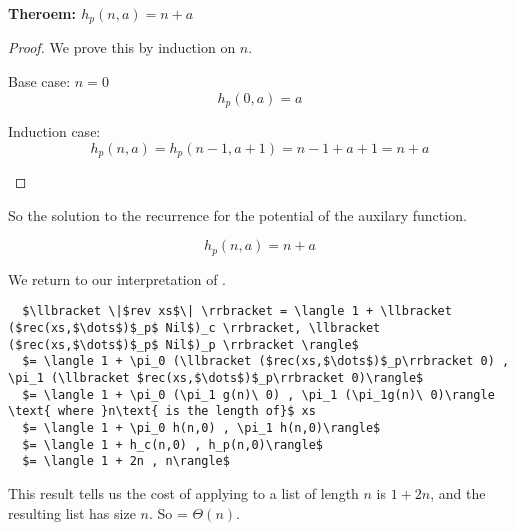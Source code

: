 \textbf{Theroem: $h_p(n,a) = n + a$}
\begin{proof}
  We prove this by induction on $n$.
  \begin{description}
    \item{Base case: $n=0$}\hfill \\
      \[ h_p(0,a) = a \]
    \item{Induction case:}\hfill \\
      \[h_p(n,a) = h_p(n-1,a+1) = n - 1 + a + 1 = n + a\]
  \end{description}
\end{proof}  

So the solution to the recurrence for the potential of the auxilary function.
\begin{framed}
  \[h_p(n,a) = n + a \]
\end{framed}


We return to our interpretation of .
\begin{lstlisting}
  $\llbracket \|$rev xs$\| \rrbracket = \langle 1 + \llbracket ($rec(xs,$\dots$)$_p$ Nil$)_c \rrbracket, \llbracket ($rec(xs,$\dots$)$_p$ Nil$)_p \rrbracket \rangle$
  $= \langle 1 + \pi_0 (\llbracket ($rec(xs,$\dots$)$_p\rrbracket 0) , \pi_1 (\llbracket $rec(xs,$\dots$)$_p\rrbracket 0)\rangle$
  $= \langle 1 + \pi_0 (\pi_1 g(n)\ 0) , \pi_1 (\pi_1g(n)\ 0)\rangle \text{ where }n\text{ is the length of}$ xs
  $= \langle 1 + \pi_0 h(n,0) , \pi_1 h(n,0)\rangle$
  $= \langle 1 + h_c(n,0) , h_p(n,0)\rangle$
  $= \langle 1 + 2n , n\rangle$
\end{lstlisting}


This result tells us the cost of applying  to a list  of length $n$ is $1+2n$, and the resulting list has size $n$.
So  = $\Theta(n)$.
